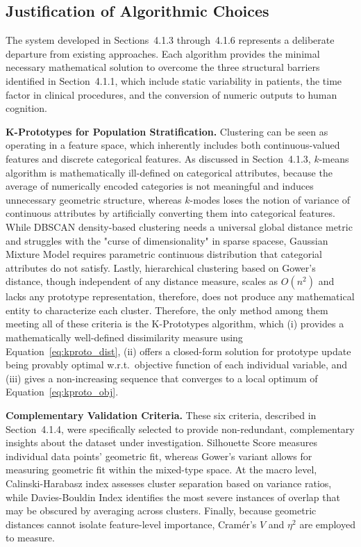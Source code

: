 \subsection{Justification of Algorithmic Choices}

The system developed in Sections~4.1.3 through~4.1.6 represents a deliberate departure from existing approaches. Each algorithm provides the minimal necessary mathematical solution to overcome the three structural barriers identified in Section~4.1.1, which include static variability in patients, the time factor in clinical procedures, and the conversion of numeric outputs to human cognition.

\textbf{K-Prototypes for Population Stratification.} Clustering can be seen as operating in a feature space, which inherently includes both continuous-valued features and discrete categorical features. As discussed in Section~4.1.3, $k$-means algorithm is mathematically ill-defined on categorical attributes, because the average of numerically encoded categories is not meaningful and induces unnecessary geometric structure, whereas $k$-modes loses the notion of variance of continuous attributes by artificially converting them into categorical features. While DBSCAN density-based clustering needs a universal global distance metric and struggles with the "curse of dimensionality" in sparse spacese, Gaussian Mixture Model requires parametric continuous distribution that categorial attributes do not satisfy. Lastly, hierarchical clustering based on Gower's distance, though independent of any distance measure, scales as $O(n^2)$ and lacks any prototype representation, therefore, does not produce any mathematical entity to characterize each cluster. Therefore, the only method among them meeting all of these criteria is the K-Prototypes algorithm, which (i) provides a mathematically well-defined dissimilarity measure using Equation~\eqref{eq:kproto_dist}, (ii) offers a closed-form solution for prototype update being provably optimal w.r.t.\ objective function of each individual variable, and (iii) gives a non-increasing sequence that converges to a local optimum of Equation~\eqref{eq:kproto_obj}.

\textbf{Complementary Validation Criteria.} These six criteria, described in Section~4.1.4, were specifically selected to provide non-redundant, complementary insights about the dataset under investigation. Silhouette Score measures individual data points' geometric fit, whereas Gower's variant allows for measuring geometric fit within the mixed-type space. At the macro level, Calinski-Harabasz index assesses cluster separation based on variance ratios, while Davies-Bouldin Index identifies the most severe instances of overlap that may be obscured by averaging across clusters. Finally, because geometric distances cannot isolate feature-level importance, Cramér's $V$ and $\eta^2$ are employed to measure.

